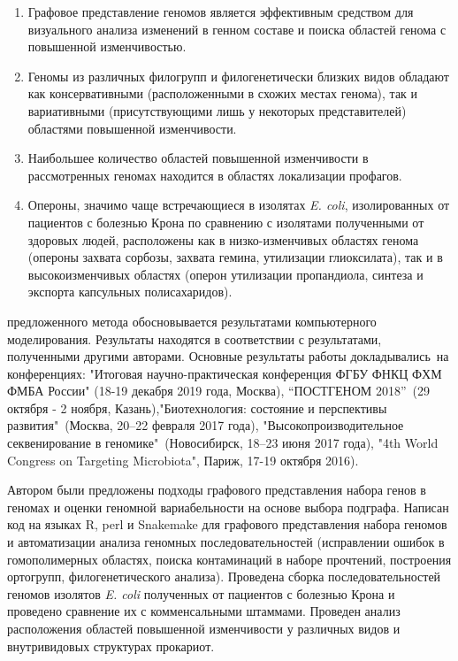 {}
\begin{enumerate}[beginpenalty=10000] %
	\item Графовое представление геномов является эффективным средством для визуального анализа изменений в генном составе и поиска областей генома с повышенной изменчивостью.

	\item Геномы из различных филогрупп и филогенетически близких видов обладают как консервативными (расположенными в схожих местах генома), так и вариативными (присутствующими лишь у некоторых представителей) областями повышенной изменчивости.

 	\item Наибольшее количество областей повышенной изменчивости в рассмотренных геномах находится в областях локализации профагов.

	\item Опероны, значимо чаще встречающиеся в изолятах \textit{E. coli}, изолированных от пациентов с болезнью Крона по сравнению с изолятами полученными от здоровых людей, расположены как в низко-изменчивых областях генома (опероны захвата сорбозы, захвата гемина, утилизации глиоксилата), так и в высокоизменчивых областях (оперон утилизации пропандиола, синтеза и экспорта капсульных полисахаридов).

\end{enumerate}


{\reliability} предложенного метода обосновывается результатами компьютерного моделирования. Результаты находятся в соответствии с результатами, полученными другими авторами. Основные результаты работы докладывались~на конференциях: "Итоговая научно-практическая конференция ФГБУ ФНКЦ ФХМ ФМБА России" (18-19 декабря 2019 года, Москва), “ПОСТГЕНОМ 2018”\  (29 октября - 2 ноября, Казань),"Биотехнология: состояние и перспективы развития"\ (Москва, 20–22 февраля 2017 года), "Высокопроизводительное секвенирование в геномике"\ (Новосибирск, 18–23 июня 2017 года), "4th World Congress on Targeting Microbiota", Париж,  17-19 октября 2016).


{\contribution} 
Автором были предложены подходы графового представления набора генов в геномах и оценки геномной вариабельности на основе выбора подграфа. Написан код на языках R, perl и Snakemake для графового представления набора геномов и автоматизации анализа геномных последовательностей (исправлении ошибок в гомополимерных областях, поиска контаминаций в наборе прочтений, построения ортогрупп, филогенетического анализа). Проведена сборка последовательностей геномов изолятов \textit{E. coli} полученных от пациентов с болезнью Крона и проведено сравнение их с комменсальными штаммами. Проведен анализ расположения областей повышенной изменчивости у различных видов и внутривидовых структурах прокариот.

